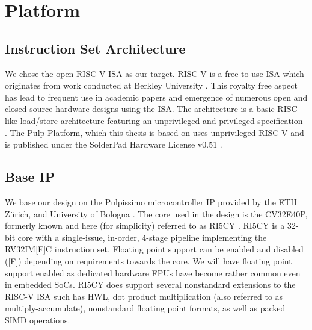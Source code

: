 \documentclass[../bachelor_paper.tex]{subfiles}
\begin{document}
\chapter{Platform}
    \label{ch:plat}

\section{Instruction Set Architecture}
We chose the open RISC-V \ac{ISA} as our target. RISC-V is a free to use \acf{ISA} which originates from work conducted at Berkley University \cite{HistoryRISCV2022}. This royalty free aspect has lead to frequent use in academic papers and emergence of numerous open and closed source hardware designs using the \ac{ISA}. The architecture is a basic RISC like load/store architecture featuring an unprivileged and privileged specification \cite{RISCVInstructionSet2022}. The Pulp Platform, which this thesis is based on uses unprivileged RISC-V and is published under the SolderPad Hardware License v0.51 \cite{GitHubPulpplatformPulpissimo2021}.

\section{Base IP}
    \label{sec:plat:base}
We base our design on the Pulpissimo microcontroller IP provided by the ETH Z\"urich, and University of Bologna \cite{schiavoneQuentinUltraLowPowerPULPissimo2018}. The core used in the design is the CV32E40P, formerly known and here (for simplicity) referred to as RI5CY \cite{gautschiNearThresholdRISCVCore2017}. RI5CY is a 32-bit core with a single-issue, in-order, 4-stage pipeline implementing the RV32IM[F]C instruction set. Floating point support can be enabled and disabled ([F]) depending on requirements towards the core. We will have floating point support enabled as dedicated hardware \acp{FPU} have become rather common even in embedded \acp{SoC}. RI5CY does support several nonstandard extensions to the RISC-V \ac{ISA} such has \acl{HWL}, dot product multiplication (also referred to as multiply-accumulate), nonstandard floating point formats, as well as packed SIMD operations.
\end{document}
